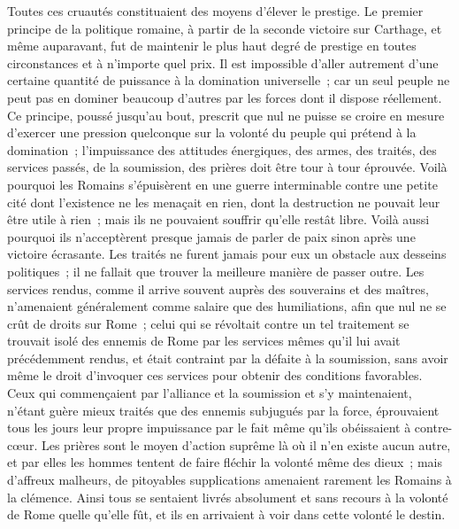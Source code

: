 \documentclass[french,twoside]{book} %
\begin{document}
Toutes ces cruautés constituaient des moyens d'élever le prestige. Le premier principe de la politique romaine, à partir de la seconde victoire sur Carthage, et même auparavant, fut de maintenir le plus haut degré de prestige en toutes circonstances et à n'importe quel prix. Il est impossible d'aller autre­ment d'une certaine quantité de puissance à la domination universelle ; car un seul peuple ne peut pas en dominer beaucoup d'autres par les forces dont il dispose réellement. Ce principe, poussé jusqu'au bout, prescrit que nul ne puisse se croire en mesure d'exercer une pression quelconque sur la volonté du peuple qui prétend à la domination ; l'impuissance des attitudes énergiques, des armes, des traités, des services passés, de la soumission, des prières doit être tour à tour éprouvée. Voilà pourquoi les Romains s'épuisèrent en une guerre interminable contre une petite cité dont l'existence ne les menaçait en rien, dont la destruction ne pouvait leur être utile à rien ; mais ils ne pouvaient souffrir qu'elle restât libre. Voilà aussi pourquoi ils n'acceptèrent presque jamais de parler de paix sinon après une victoire écrasante. Les traités ne furent jamais pour eux un obstacle aux desseins politiques ; il ne fallait que trouver la meilleure manière de passer outre. Les services rendus, comme il arrive souvent auprès des souverains et des maîtres, n'amenaient généralement comme salaire que des humiliations, afin que nul ne se crût de droits sur Rome ; celui qui se révoltait contre un tel traitement se trouvait isolé des ennemis de Rome par les services mêmes qu'il lui avait précédemment rendus, et était contraint par la défaite à la soumission, sans avoir même le droit d'invoquer ces services pour obtenir des conditions favorables. Ceux qui commençaient par l'alliance et la soumission et s'y maintenaient, n'étant guère mieux traités que des ennemis subjugués par la force, éprouvaient tous les jours leur propre impuissance par le fait même qu'ils obéissaient à contre-cœur. Les prières sont le moyen d'action suprême là où il n'en existe aucun autre, et par elles les hommes tentent de faire fléchir la volonté même des dieux ; mais d'affreux malheurs, de pitoyables supplications amenaient rare­ment les Romains à la clémence. Ainsi tous se sentaient livrés absolument et sans recours à la volonté de Rome quelle qu'elle fût, et ils en arrivaient à voir dans cette volonté le destin.\par
\end{document}
